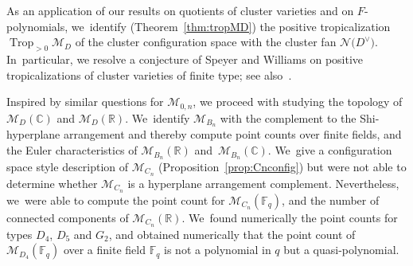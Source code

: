\documentclass[pdftex]{sigma}%
\def\R{{\mathbb R}}
\def\C{{\mathbb C}}
\def\F{{\mathbb F}}
\def\M{{\mathcal{M}}}
\def\N{{\mathcal{N}}}
\def\Trop{\operatorname{Trop}}
\numberwithin{equation}{section}
\begin{document}
As an application of our results on quotients of cluster varieties and on $F$-polynomials, we~identify (Theorem~\ref{thm:tropMD}) the positive tropicalization $\Trop_{>0} \M_D$ of the cluster configuration space with the cluster fan $\N\big(D^\vee\big)$. In~particular, we resolve a conjecture of Speyer and Williams \cite[Conjecture~8.1]{SW} on positive tropicalizations of cluster varieties of finite type; see also~\cite{JLS}.

\bigskip{}
Inspired by similar questions for $\M_{0,n}$, we proceed with studying the topology of $\M_{D}(\C)$ and $\M_{D}(\R)$. We~identify $\M_{B_n}$ with the complement to the Shi-hyperplane arrangement and thereby compute point counts over finite fields, and the Euler characteristics of $\M_{B_n}(\R)$ and~$\M_{B_n}(\C)$. We~give a configuration space style description of $\M_{C_n}$ (Proposition~\ref{prop:Cnconfig}) but were not able to determine whether $\M_{C_n}$ is a hyperplane arrangement complement. Nevertheless, we~were able to compute the point count for $\M_{C_n}(\F_q)$, and the number of connected components of $\M_{C_n}(\R)$. We~found numerically the point counts for types $D_4$, $D_5$ and $G_2$, and obtained numerically that the point count of $\M_{D_4}(\F_q)$ over a finite field $\F_q$ is not a polynomial in $q$ but a quasi-polynomial.
\end{document}

